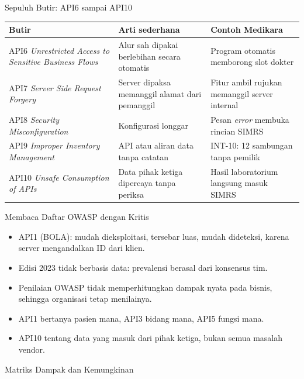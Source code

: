 \documentclass[aspectratio=169, table, 12pt]{beamer}
\begin{document}
\begin{frame}{{\Large Sepuluh Butir: API6 sampai API10}}
  \footnotesize
  \begin{tabularx}{\textwidth}{>{\raggedright\arraybackslash}p{4.3cm}
      >{\raggedright\arraybackslash}X >{\raggedright\arraybackslash}X}
    \hline
    \textbf{Butir} & \textbf{Arti sederhana} & \textbf{Contoh Medikara} \\ \hline
    API6 \textit{Unrestricted Access to Sensitive Business Flows} & Alur sah dipakai berlebihan secara otomatis & Program otomatis memborong slot dokter \\ \hline
    API7 \textit{Server Side Request Forgery} & Server dipaksa memanggil alamat dari pemanggil & Fitur ambil rujukan memanggil server internal \\ \hline
    API8 \textit{Security Misconfiguration} & Konfigurasi longgar & Pesan \textit{error} membuka rincian SIMRS \\ \hline
    API9 \textit{Improper Inventory Management} & API atau aliran data tanpa catatan & INT-10: 12 sambungan tanpa pemilik \\ \hline
    API10 \textit{Unsafe Consumption of APIs} & Data pihak ketiga dipercaya tanpa periksa & Hasil laboratorium langsung masuk SIMRS \\ \hline
  \end{tabularx}
\end{frame}

\begin{frame}{{\Large Membaca Daftar OWASP dengan Kritis}}
  \vspace{10pt}
  \begin{itemize}
    \item API1 (BOLA): mudah dieksploitasi, tersebar luas, mudah dideteksi, karena server mengandalkan ID dari klien.
    \item Edisi 2023 tidak berbasis data: prevalensi berasal dari konsensus tim.
    \item Penilaian OWASP tidak memperhitungkan dampak nyata pada bisnis, sehingga organisasi tetap menilainya.
    \item API1 bertanya pasien mana, API3 bidang mana, API5 fungsi mana.
    \item API10 tentang data yang masuk dari pihak ketiga, bukan semua masalah vendor.
  \end{itemize}
\end{frame}

\begin{frame}{{\Large Matriks Dampak dan Kemungkinan}}
  \centering
\end{frame}
\end{document}

